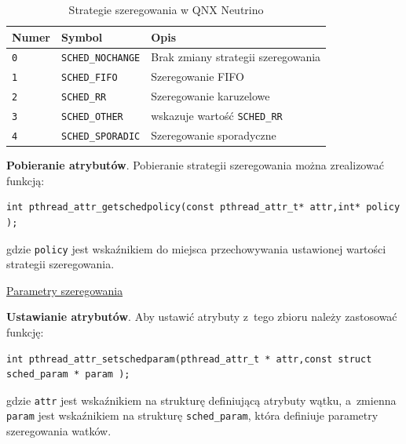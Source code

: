 \begin{table}[h!]
\centering
\caption{Strategie szeregowania w QNX Neutrino}
\setlength{\arrayrulewidth}{1pt}
\setlength{\tabcolsep}{6pt}
\renewcommand{\arraystretch}{1.2}
\begin{tabular}{ |p{}|p{}|p{}| }
\hline \rowcolor{gray}
\textbf{Numer} & \textbf{Symbol} & \textbf{Opis} \\ \hline
\mbox{\lstinline[style=MyCStyle]{0}} & \mbox{\lstinline[style=MyCStyle]{SCHED_NOCHANGE}} & Brak zmiany strategii szeregowania \\ \hline 
\mbox{\lstinline[style=MyCStyle]{1}} & \mbox{\lstinline[style=MyCStyle]{SCHED_FIFO}} & Szeregowanie FIFO \\ \hline 
\mbox{\lstinline[style=MyCStyle]{2}} & \mbox{\lstinline[style=MyCStyle]{SCHED_RR}} & Szeregowanie karuzelowe \\ \hline 
\mbox{\lstinline[style=MyCStyle]{3}} & \mbox{\lstinline[style=MyCStyle]{SCHED_OTHER}} & wskazuje wartość \mbox{\lstinline[style=MyCStyle]{SCHED_RR}} \\ \hline 
\mbox{\lstinline[style=MyCStyle]{4}} & \mbox{\lstinline[style=MyCStyle]{SCHED_SPORADIC}} & Szeregowanie sporadyczne \\ \hline 
\end{tabular}
\label{tab:sched}
\end{table}

\noindent\textbf{Pobieranie atrybutów}. Pobieranie strategii szeregowania można zrealizować funkcją:

\begin{lstlisting}[style=MyCStyle]
int pthread_attr_getschedpolicy(const pthread_attr_t* attr,int* policy );
\end{lstlisting}

gdzie \lstinline[style=MyCStyle]{policy} jest wskaźnikiem do miejsca przechowywania ustawionej wartości strategii szeregowania. 

\noindent\underline{Parametry szeregowania}

\noindent\textbf{Ustawianie atrybutów}. Aby ustawić atrybuty z~tego zbioru należy zastosować funkcję: 

\begin{lstlisting}[style=MyCStyle]
int pthread_attr_setschedparam(pthread_attr_t * attr,const struct sched_param * param );
\end{lstlisting}

gdzie \lstinline[style=MyCStyle]{attr} jest wskaźnikiem na strukturę definiującą atrybuty wątku, a~zmienna \lstinline[style=MyCStyle]{param} jest wskaźnikiem na strukturę \lstinline[style=MyCStyle]{sched_param}, która definiuje parametry szeregowania watków. 

